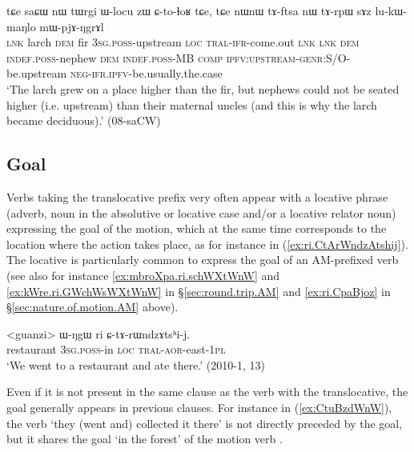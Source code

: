 \begin{exe}
\ex \label{ex:saCW.CtolhoR}
\gll  tɕe saɕɯ nɯ tɯrgi ɯ-locu zɯ ɕ-to-ɬoʁ tɕe, tɕe nɯnɯ tɤ-ftsa nɯ tɤ-rpɯ sɤz lu-kɯ-maŋlo mɯ-pjɤ-ŋgrɤl\\
\textsc{lnk} larch \textsc{dem} fir \textsc{3sg}.\textsc{poss}-upstream \textsc{loc} \textsc{tral}-\textsc{ifr}-come.out \textsc{lnk} \textsc{lnk}  \textsc{dem} \textsc{indef}.\textsc{poss}-nephew \textsc{dem} \textsc{indef}.\textsc{poss}-MB \textsc{comp} \textsc{ipfv}:\textsc{upstream}-\textsc{genr}:S/O-be.upstream \textsc{neg}-\textsc{ifr}.\textsc{ipfv}-be.usually.the.case  \\
\glt `The larch grew on a place higher than the fir, but nephews could not be seated higher (i.e. upstream) than their maternal uncles (and this is why the larch became deciduous).' (08-saCW)
\end{exe}
 
 
\subsection{Goal} \label{sec:AM.goal}
Verbs taking the translocative prefix very often appear with a locative phrase (adverb, noun in the absolutive or locative case and/or a locative relator noun) expressing the goal of the motion, which at the same time corresponds to the location where the action takes place, as for instance in (\ref{ex:ri.CtArWndzAtshij}). The locative  is particularly common to express the goal of an AM-prefixed verb (see also for instance  \ref{ex:mbroXpa.ri.schWXtWnW}  and \ref{ex:kWre.ri.GWchWsWXtWnW} in §\ref{sec:round.trip.AM} and \ref{ex:ri.CpaBjoz} in §\ref{sec:nature.of.motion.AM} above).

\begin{exe}
\ex \label{ex:ri.CtArWndzAtshij} 
\gll <guanzi> ɯ-ŋgɯ ri ɕ-tɤ-rɯndzɤtsʰi-j. \\
restaurant \textsc{3sg}.\textsc{poss}-in \textsc{loc} \textsc{tral}-\textsc{aor}-east-\textsc{1pl} \\
\glt `We went to a restaurant and ate there.' (2010-1, 13)
\end{exe}

Even if it is not present in the same clause as the verb with the translocative, the goal generally appears in previous clauses. For instance in (\ref{ex:CtuBzdWnW}), the verb  `they (went and) collected it there' is not directly preceded by the goal, but it shares the goal  `in the forest' of the motion verb .

